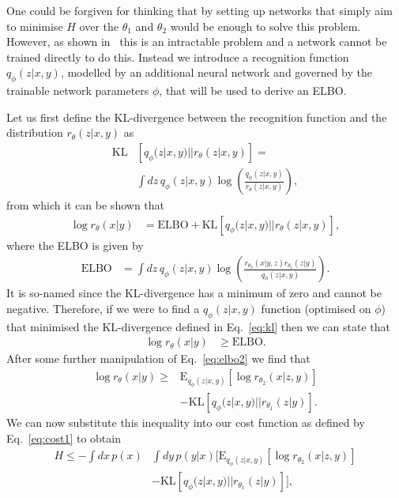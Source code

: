 \documentclass[%
showpacs,
nofootinbib,
 amsmath,amssymb,
 aps,
 twocolumn,
 prl,
 reprint,
floatfix,
]{revtex4-1}
\begin{document}
%
%
One could be forgiven for thinking that by setting up networks that simply aim
to minimise $H$ over the $\theta_{1}$ and $\theta_{2}$ would be enough to solve
this problem. However, as shown in~\cite{NIPS2015_5775} this is an intractable
problem and a network cannot be trained directly to do this. Instead we
introduce a recognition function $q_{\phi}(z|x,y)$, modelled by an
additional neural network and governed by the trainable network parameters
$\phi$, that will be used to derive an \ac{ELBO}.

%
%
Let us first define the \ac{KL}-divergence between the recognition function and
the distribution $r_{\theta}(z|x,y)$ as 
%
\begin{align}\label{eq:kl}
\text{KL}&\left[q_{\phi}(z|x,y)||r_{\theta}(z|x,y)\right] = \\
&\int dz\,q_{\phi}(z|x,y)
\log\left(\frac{q_{\phi}(z|x,y)}{r_{\theta}(z|x,y)}\right),\nonumber
\end{align}
%   
from which it can be shown that
%
\begin{align}\label{eq:elbo1}
\log r_{\theta}(x|y) &= \text{ELBO} + \text{KL}\left[q_{\phi}(z|x,y)||r_{\theta}(z|x,y)\right],
\end{align}
%
where the \ac{ELBO} is given by
%
\begin{align}\label{eq:elbo2}
\text{ELBO} &= \int dz\,
q_{\phi}(z|x,y)\log\left(\frac{r_{\theta_{2}}(x|y,z)r_{\theta_{1}}(z|y)}{q_{\phi}(z|x,y)}\right).
\end{align}
%
It is so-named since the \ac{KL}-divergence has a minimum of zero and cannot
be negative. Therefore, if we were to find a $q_{\phi}(z|x,y)$ function (optimised on
$\phi$) that minimised the \ac{KL}-divergence defined in Eq.~\ref{eq:kl} then we can state that
%
\begin{align}
\log r_{\theta}(x|y) &\geq \text{ELBO}.
\end{align}
%
After some further manipulation of Eq.~\ref{eq:elbo2} we find that
%
\begin{align}\label{eq:logr}
\log r_{\theta}(x|y) \geq  &\text{E}_{q_{\phi}(z|x,y)}\left[\log
r_{\theta_{2}}(x|z,y)\right] \nonumber\\
&-\text{KL}\left[q_{\phi}(z|x,y)||r_{\theta_{1}}(z|y)\right].
\end{align}
%
We can now substitute this inequality into our cost function as defined by
Eq.~\ref{eq:cost1} to obtain
%
\begin{align}\label{eq:cost2}
H \leq  -\int dx\, p(x)&\int dy \,p(y|x)
\Big[\text{E}_{q_{\phi}(z|x,y)}\left[\log r_{\theta_{2}}(x|z,y)\right]
\nonumber\\
&-\text{KL}\left[q_{\phi}(z|x,y)||r_{\theta_{1}}(z|y)\right]\Big],  
\end{align}
\end{document}
